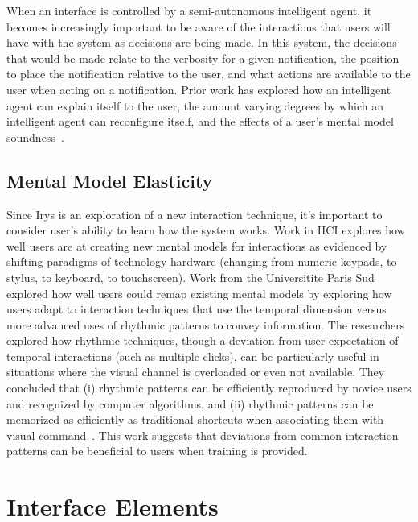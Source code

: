When an interface is controlled by a semi-autonomous intelligent agent, it
becomes increasingly important to be aware of the interactions that users will
have with the system as decisions are being made.  In this system, the
decisions that would be made relate to the verbosity for a given notification,
the position to place the notification relative to the user, and what actions
are available to the user when acting on a notification.  Prior work has
explored how an intelligent agent can explain itself to the user, the amount
varying degrees by which an intelligent agent can reconfigure itself, and the
effects of a user's mental model soundness~\cite{kulesza2012tell}.



\subsection{                   Mental Model Elasticity                       }

Since Irys is an exploration of a new interaction technique, it's important to
consider user's ability to learn how the system works. Work in HCI explores how
well users are at creating new mental models for interactions as evidenced by
shifting paradigms of technology hardware (changing from numeric keypads, to
stylus, to keyboard, to touchscreen).  Work from the Universitite Paris Sud
explored how well users could remap existing mental models by exploring how
users adapt to interaction techniques that use the temporal dimension versus
more advanced uses of rhythmic patterns to convey information.  The researchers
explored how rhythmic techniques, though a deviation from  user expectation of
temporal interactions (such as multiple clicks), can be particularly useful in
situations where the visual channel is overloaded or even not available.  They
concluded that  (i) rhythmic patterns can be efficiently reproduced by novice
users and recognized by computer algorithms, and (ii) rhythmic patterns can be
memorized as efficiently as traditional shortcuts when associating them with
visual command~\cite{ghomi2012using}.  This work suggests that deviations from
common interaction patterns can be beneficial to users when training is
provided.

\section{                  Interface Elements                                }


